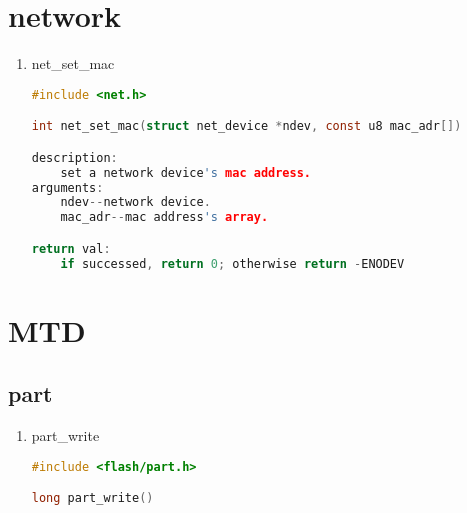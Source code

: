 \section{network}
\begin{enumerate}
\item net\_set\_mac
\begin{lstlisting}[language=c, numbers=none]
#include <net.h>

int net_set_mac(struct net_device *ndev, const u8 mac_adr[])

description:
	set a network device's mac address.
arguments:
	ndev--network device.
	mac_adr--mac address's array.

return val:
	if successed, return 0; otherwise return -ENODEV
\end{lstlisting}
\end{enumerate}

\section{MTD}
\subsection{part}
\begin{enumerate}
\item part\_write
\begin{lstlisting}[language=c, numbers=none]
#include <flash/part.h>

long part_write()
\end{lstlisting}
\end{enumerate}

